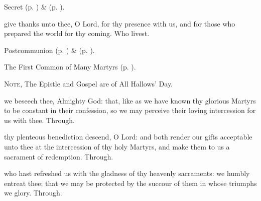 
\begin{rubric}
	 Secret  (p. \pageref{AllHallowsSecret}) \&   (p. \pageref{FourCrownedMartyrsSecret}).
\end{rubric}


\postcommunion
{} give thanks unto thee, O Lord, for thy presence with us, and for those who prepared the world for thy coming. Who livest.


\begin{rubric}
	 Postcommunion  (p. \pageref{AllHallowsPostcommunion}) \&   (p. \pageref{FourCrownedMartyrsPostcommunion}).
\end{rubric}



\label{FourCrownedMartyrs}

\begin{rubric}
	The First Common of Many Martyrs (p. \pageref{CommonMartyrsI}).
\end{rubric}

\begin{rubric}
	\textsc{Note,} The Epistle and Gospel are of All Hallows' Day.
\end{rubric}

\collect\label{FourCrownedMartyrsCollect}
 we beseech thee, Almighty God: that, like as we have known thy glorious Martyrs to be constant in their confession, so we may perceive their loving intercession for us with thee. Through.

\secret\label{FourCrownedMartyrsSecret}
 thy plenteous benediction descend, O Lord: and both render our gifts acceptable unto thee at the intercession of thy holy Martyrs, and make them to us a sacrament of redemption. Through.

\postcommunion\label{FourCrownedMartyrsPostcommunion}
 who hast refreshed us with the gladness of thy heavenly sacraments: we humbly entreat thee; that we may be protected by the succour of them in whose triumphs we glory. Through.



